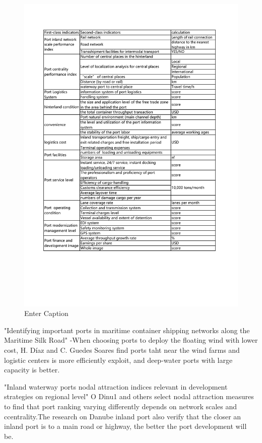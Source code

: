 \documentclass[preprint]{elsarticle}
\begin{document}
\begin{figure}
    \centering
    \includegraphics[width=\linewidth]{pic/PortRankIndicators.pdf}
    \caption{Enter Caption}
    \label{fig:PortIndecator}
\end{figure}

"Identifying important ports in maritime container shipping networks along the Maritime Silk Road" -When choosing ports to deploy the floating wind with lower cost, H. Díaz  and C. Guedes Soares find ports taht near the wind farms and logistic centers is more efficiently exploit, and deep-water ports with large capacity is better.

"Inland waterway ports nodal attraction indices relevant in development strategies on regional level"
O Dinu1 and others select nodal attraction measures to find that port ranking varying differently depends on network scales and ccentrality.The research on Danube inland   port also verify that the closer an inland port is to a main road or highway, the better the port development will be.
\end{document}

